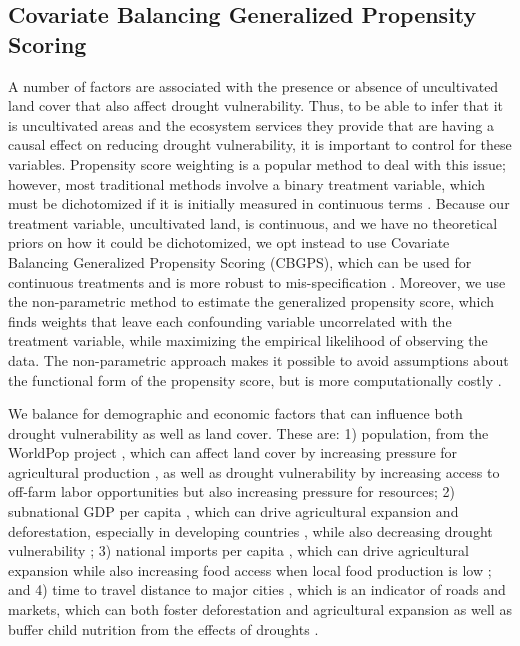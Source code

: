 \documentclass{article}
\begin{document}
\subsection{Covariate Balancing Generalized Propensity Scoring}
A number of factors are associated with the presence or absence of uncultivated land cover that also affect drought vulnerability.  Thus, to be able to infer that it is uncultivated areas and the ecosystem services they provide that are having a causal effect on reducing drought vulnerability, it is important to control for these variables.  Propensity score weighting is a popular method to deal with this issue; however, most traditional methods involve a binary treatment variable, which must be dichotomized if it is initially measured in continuous terms \cite{Hirano2003, Robins2000}.  Because our treatment variable, uncultivated land, is continuous, and we have no theoretical priors on how it could be dichotomized, we opt instead to use Covariate Balancing Generalized Propensity Scoring (CBGPS), which can be used for continuous treatments and is more robust to mis-specification \cite{Fong2018}.  Moreover, we use the non-parametric method to estimate the generalized propensity score, which finds weights that leave each confounding variable uncorrelated with the treatment variable, while maximizing the empirical likelihood of observing the data.  The non-parametric approach makes it possible to avoid assumptions about the functional form of the propensity score, but is more computationally costly \cite{Fong2018}.

We balance for demographic and economic factors that can influence both drought vulnerability as well as land cover.  These are: 1) population, from the WorldPop project \cite{Tatem2017}, which can affect land cover by increasing pressure for agricultural production \cite{ouedraogo2010land}, as well as drought vulnerability by increasing access to off-farm labor opportunities but also increasing pressure for resources; 2) subnational GDP per capita \cite{Kummu2018}, which can drive agricultural expansion and deforestation, especially in developing countries \cite{culas2012redd}, while also decreasing drought vulnerability \cite{Carrao2016}; 3) national imports per capita \cite{WorldBank2017}, which can drive agricultural expansion \cite{Meyfroidt2013} while also increasing food access when local food production is low \cite{janssens2020global}; and 4) time to travel distance to major cities \cite{Weiss2018, Uchida2008}, which is an indicator of roads and markets, which can both foster deforestation and agricultural expansion \cite{barber2014roads} as well as buffer child nutrition from the effects of droughts \cite{Shively2017}.
\end{document}
